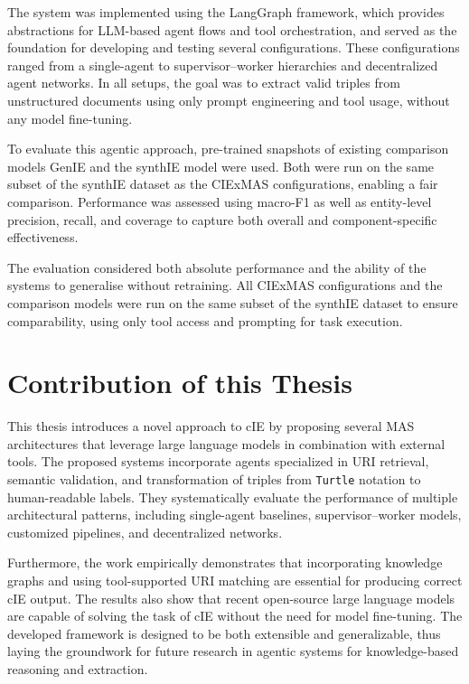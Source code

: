 \documentclass[a4paper,oneside,bibliography=totoc]{scrbook}
\begin{document}
The system was implemented using the LangGraph framework, which provides abstractions for \ac{LLM}-based agent flows and tool orchestration, and served as the foundation for developing and testing several configurations. These configurations ranged from a single-agent to supervisor–worker hierarchies and decentralized agent networks. In all setups, the goal was to extract valid triples from unstructured documents using only prompt engineering and tool usage, without any model fine-tuning.

To evaluate this agentic approach, pre-trained snapshots of existing comparison models GenIE and the synthIE model were used. Both were run on the same subset of the synthIE dataset as the CIExMAS configurations, enabling a fair comparison. Performance was assessed using macro-F1 as well as entity-level precision, recall, and coverage to capture both overall and component-specific effectiveness.

The evaluation considered both absolute performance and the ability of the systems to generalise without retraining. All CIExMAS configurations and the comparison models were run on the same subset of the synthIE dataset to ensure comparability, using only tool access and prompting for task execution.

\section{Contribution of this Thesis}
\label{sec:contribution}

This thesis introduces a novel approach to \ac{cIE} by proposing several \ac{MAS} architectures that leverage large language models in combination with external tools. The proposed systems incorporate agents specialized in URI retrieval, semantic validation, and transformation of triples from \texttt{Turtle} notation to human-readable labels. They systematically evaluate the performance of multiple architectural patterns, including single-agent baselines, supervisor–worker models, customized pipelines, and decentralized networks.

Furthermore, the work empirically demonstrates that incorporating knowledge graphs and using tool-supported URI matching are essential for producing correct \ac{cIE} output. The results also show that recent open-source large language models are capable of solving the task of \ac{cIE} without the need for model fine-tuning. The developed framework is designed to be both extensible and generalizable, thus laying the groundwork for future research in agentic systems for knowledge-based reasoning and extraction.
\end{document}
